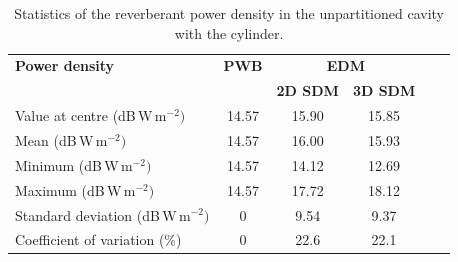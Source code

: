 \documentclass[a4paper]{article}
\numberwithin{equation}{section}
\begin{document}
\begin{table}[ht]
\begin{center}
\begin{tabular}{|l|c|c|c|c|c|}
\hline
\textbf{Power density}               &\textbf{PWB} &\multicolumn{2}{|c|}{\textbf{EDM}} \\ \cline{3-4}
{}                                   &{}           &\textbf{2D SDM} &\textbf{3D SDM}  \\
\hline
Value at centre (dB\,W\,m$^{-2})$    &14.57        &15.90           &15.85 \\
Mean (dB\,W\,m$^{-2})$               &14.57        &16.00           &15.93 \\
Minimum (dB\,W\,m$^{-2})$            &14.57        &14.12           &12.69 \\
Maximum (dB\,W\,m$^{-2})$            &14.57        &17.72           &18.12 \\
Standard deviation (dB\,W\,m$^{-2})$ &0            &9.54            &9.37  \\
Coefficient of variation (\%)        &0            &22.6            &22.1  \\
\hline
\end{tabular}
\end{center}
\caption{\label{tb:unpartcyl} Statistics of the reverberant power density in the unpartitioned cavity with the cylinder.}
\end{table}
\end{document}
